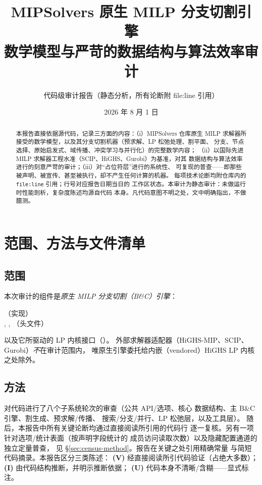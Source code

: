 \documentclass[11pt]{ctexart}
\title{\textbf{MIPSolvers 原生 MILP 分支切割引擎}\\[6pt]
\large 数学模型与严苛的数据结构与算法效率审计}
\author{代码级审计报告（静态分析，所有论断附 file:line 引用）}
\date{2026 年 8 月 1 日}
\begin{document}
\maketitle

\begin{abstract}
\noindent
本报告直接依据源代码，记录三方面的内容：（i）MIPSolvers 仓库原生 MILP
求解器所接受的数学模型，以及其分支切割机器（预求解、LP 松弛处理、割平面、
分支、节点选择、原始启发式、域传播、冲突学习与并行化）的完整数学内容；
（ii）以国际先进 MILP 求解器工程水准（SCIP、HiGHS、Gurobi）为基准，对其
数据结构与算法效率进行的刻意严苛的审计；（iii）对“占位符层”进行的系统性、
可复现的普查——即那些被声明、被宣传、甚至被执行，却不产生任何计算的机器。
每项技术论断均附仓库内的 \texttt{file:line} 引用；行号对应报告日期当日的
工作区状态。本审计为静态审计：未做运行时性能剖析，复杂度陈述均源自代码
本身。凡代码意图不明之处，文中明确指出，不做臆测。
\end{abstract}

\tableofcontents
\newpage

\section{范围、方法与文件清单}

\subsection{范围}
本次审计的组件是\emph{原生 MILP 分支切割（B\&C）引擎}：
\begin{center}
 \quad （实现）\\
, ,
 \quad （头文件）
\end{center}
以及它所驱动的 LP 内核接口（）。
外部求解器适配器（HiGHS-MIP、SCIP、Gurobi）\emph{不}在审计范围内，
唯原生引擎委托给内嵌（vendored）HiGHS LP 内核之处除外。

\subsection{方法}
对代码进行了八个子系统轮次的审查（公共 API/选项、核心
数据结构、主 B\&C 引擎、割生成、预求解/传播、
搜索/分支/并行、LP 松弛层，以及工具层）。
随后，本报告中所有关键论断均通过直接阅读所引用的代码行
逐一复核。另有一项针对选项/统计表面（按声明字段统计的
成员访问读取次数）以及隐藏配置通道的独立定量普查，
见 \S\ref{sec:census-method}。报告在关键之处引用精确常量
与简短代码摘录。本报告区分三类陈述：
\textbf{(V)} 经直接阅读所引代码验证（占绝大多数）；
\textbf{(I)} 由代码结构推断，并明示推断依据；
\textbf{(U)} 代码本身不清晰/含糊——显式标注。
\end{document}
